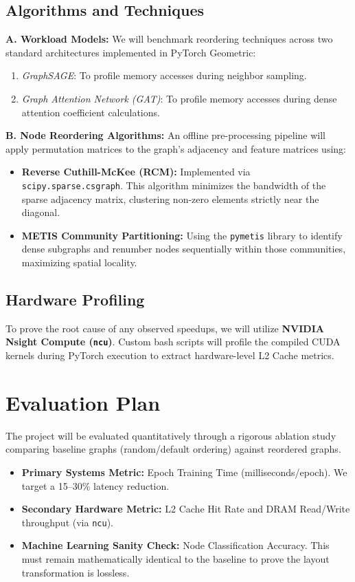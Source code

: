 \documentclass[sigconf,review]{acmart}
\begin{document}
\subsection{Algorithms and Techniques}
\textbf{A. Workload Models:} We will benchmark reordering techniques across two standard architectures implemented in PyTorch Geometric:
\begin{enumerate}
    \item \textit{GraphSAGE}: To profile memory accesses during neighbor sampling.
    \item \textit{Graph Attention Network (GAT)}: To profile memory accesses during dense attention coefficient calculations.
\end{enumerate}

\textbf{B. Node Reordering Algorithms:} An offline pre-processing pipeline will apply permutation matrices to the graph's adjacency and feature matrices using:
\begin{itemize}
    \item \textbf{Reverse Cuthill-McKee (RCM):} Implemented via \texttt{scipy.sparse.csgraph}. This algorithm minimizes the bandwidth of the sparse adjacency matrix, clustering non-zero elements strictly near the diagonal.
    \item \textbf{METIS Community Partitioning:} Using the \texttt{pymetis} library to identify dense subgraphs and renumber nodes sequentially within those communities, maximizing spatial locality.
\end{itemize}

\subsection{Hardware Profiling}
To prove the root cause of any observed speedups, we will utilize \textbf{NVIDIA Nsight Compute (\texttt{ncu})}. Custom bash scripts will profile the compiled CUDA kernels during PyTorch execution to extract hardware-level L2 Cache metrics.

\section{Evaluation Plan}
The project will be evaluated quantitatively through a rigorous ablation study comparing baseline graphs (random/default ordering) against reordered graphs. 

\begin{itemize}
    \item \textbf{Primary Systems Metric:} Epoch Training Time (milliseconds/epoch). We target a 15--30\% latency reduction.
    \item \textbf{Secondary Hardware Metric:} L2 Cache Hit Rate and DRAM Read/Write throughput (via \texttt{ncu}).
    \item \textbf{Machine Learning Sanity Check:} Node Classification Accuracy. This must remain mathematically identical to the baseline to prove the layout transformation is lossless.
\end{itemize}
\end{document}
